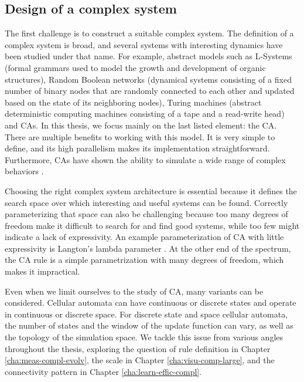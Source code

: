 \subsection{Design of a complex system\label{sec:design-compl-syst}}

The first challenge is to construct a suitable complex system. The definition of a 
complex system is broad, and several systems with
interesting dynamics have been studied under that name. For example, abstract models such as L-Systems (formal grammars used to model the growth and development of organic structures),
Random Boolean networks (dynamical systems consisting of a fixed number of binary nodes 
that are randomly connected to each other and updated based on the state of its neighboring 
nodes), Turing machines (abstract deterministic computing machines consisting of a tape and 
a read-write head) and \Acfp{CA}. In this thesis, we
focus mainly on the last listed element: the \acl{CA}. There are multiple
benefits to working with this model. It is very simple to define, and its high
parallelism makes its implementation straightforward. Furthermore, \acp{CA} have
shown the ability to simulate a wide range of complex behaviors
\parencite{wolframNewKindScience2002}.

Choosing the right complex system architecture is essential because it defines
the search space over which interesting and useful systems can be found.
Correctly parameterizing that space can also be challenging because too many
degrees of freedom make it difficult to search for and find good systems, while
too few might indicate a lack of expressivity. An example parameterization of
\ac{CA} with little expressivity is Langton's lambda parameter
\parencite{langtonComputationEdgeChaos1990}. At the other end of the spectrum, the
\ac{CA} rule is a simple parametrization with many degrees of freedom, which
makes it impractical.

Even when we limit ourselves to the study of \ac{CA}, many variants can be
considered. Cellular automata can have continuous or discrete states and operate
in continuous or discrete space. For discrete state and space cellular automata,
the number of states and the window of the update function can vary, as well as the
topology of the simulation space. We tackle this issue from various angles
throughout the thesis, exploring the question of rule definition in Chapter
\ref{cha:meas-compl-evolv}, the scale in Chapter \ref{cha:visu-comp-large}, and
the connectivity pattern in Chapter \ref{cha:learn-effic-compl}.

